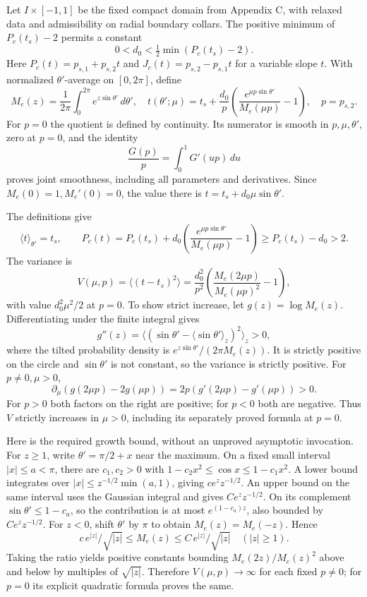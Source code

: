 \documentclass[10pt,a4paper]{article}
\begin{document}
Let \(I\times[-1,1]\) be the fixed compact domain from Appendix C, with relaxed data and admissibility on radial boundary collars. The positive minimum of \(P_c(t_s)-2\) permits a constant \[
0<d_0<\tfrac12\min(P_c(t_s)-2).
\] Here \(P_c(t)=p_{s,1}+p_{s,2}t\) and \(J_c(t)=p_{s,2}-p_{s,1}t\) for a variable slope \(t\). With normalized \(\theta'\)-average on \([0,2\pi]\), define \[
M_e(z)=\frac1{2\pi}\int_0^{2\pi}e^{z\sin\theta'}\,d\theta',
\quad
t(\theta';\mu)=t_s+
\frac{d_0}{p}\left(\frac{e^{\mu p\sin\theta'}}{M_e(\mu p)}-1\right),
\quad p=p_{s,2}.
\] For \(p=0\) the quotient is defined by continuity. Its numerator is smooth in \(p,\mu,\theta'\), zero at \(p=0\), and the identity \[
\frac{G(p)}p=\int_0^1G'(up)\,du
\] proves joint smoothness, including all parameters and derivatives. Since \(M_e(0)=1,M_e'(0)=0\), the value there is \(t=t_s+d_0\mu\sin\theta'\).

The definitions give \[
\langle t\rangle_{\theta'}=t_s,\qquad
P_c(t)=P_c(t_s)+d_0\left(\frac{e^{\mu p\sin\theta'}}{M_e(\mu p)}-1\right)
\ge P_c(t_s)-d_0>2.
\] The variance is \[
V(\mu,p)=\langle(t-t_s)^2\rangle
=\frac{d_0^2}{p^2}
\left(\frac{M_e(2\mu p)}{M_e(\mu p)^2}-1\right),
\] with value \(d_0^2\mu^2/2\) at \(p=0\). To show strict increase, let \(g(z)=\log M_e(z)\). Differentiating under the finite integral gives \[
g''(z)=
\langle(\sin\theta'-\langle\sin\theta'\rangle_z)^2\rangle_z>0,
\] where the tilted probability density is \(e^{z\sin\theta'}/(2\pi M_e(z))\). It is strictly positive on the circle and \(\sin\theta'\) is not constant, so the variance is strictly positive. For \(p\ne0,\mu>0\), \[
\partial_\mu(g(2\mu p)-2g(\mu p))
=2p(g'(2\mu p)-g'(\mu p))>0.
\] For \(p>0\) both factors on the right are positive; for \(p<0\) both are negative. Thus \(V\) strictly increases in \(\mu>0\), including its separately proved formula at \(p=0\).

Here is the required growth bound, without an unproved asymptotic invocation. For \(z\ge1\), write \(\theta'=\pi/2+x\) near the maximum. On a fixed small interval \(|x|\le a<\pi\), there are \(c_1,c_2>0\) with \(1-c_2x^2\le\cos x\le1-c_1x^2\). A lower bound integrates over \(|x|\le z^{-1/2}\min(a,1)\), giving \(ce^zz^{-1/2}\). An upper bound on the same interval uses the Gaussian integral and gives \(Ce^zz^{-1/2}\). On its complement \(\sin\theta'\le1-c_a\), so the contribution is at most \(e^{(1-c_a)z}\), also bounded by \(Ce^zz^{-1/2}\). For \(z<0\), shift \(\theta'\) by \(\pi\) to obtain \(M_e(z)=M_e(-z)\). Hence \[
c\,e^{|z|}/\sqrt{|z|}
\le M_e(z)\le C\,e^{|z|}/\sqrt{|z|}\quad (|z|\ge1).
\] Taking the ratio yields positive constants bounding \(M_e(2z)/M_e(z)^2\) above and below by multiples of \(\sqrt{|z|}\). Therefore \(V(\mu,p)\to\infty\) for each fixed \(p\ne0\); for \(p=0\) its explicit quadratic formula proves the same.
\end{document}
